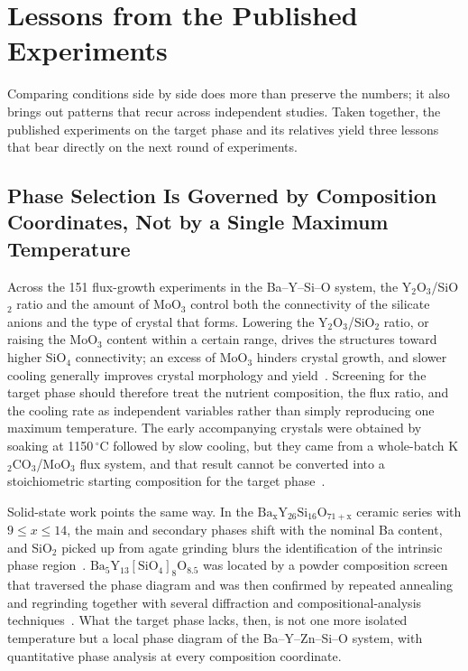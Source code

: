 \section{Lessons from the Published Experiments}
\label{sec:prior-findings}

Comparing conditions side by side does more than preserve the numbers; it also brings out patterns that recur across independent studies. Taken together, the published experiments on the target phase and its relatives yield three lessons that bear directly on the next round of experiments.

\subsection{Phase Selection Is Governed by Composition Coordinates, Not by a Single Maximum Temperature}

Across the 151 flux-growth experiments in the Ba--Y--Si--O system, the Y$_2$O$_3$\slash SiO$_2$ ratio and the amount of MoO$_3$ control both the connectivity of the silicate anions and the type of crystal that forms. Lowering the Y$_2$O$_3$\slash SiO$_2$ ratio, or raising the MoO$_3$ content within a certain range, drives the structures toward higher SiO$_4$ connectivity; an excess of MoO$_3$ hinders crystal growth, and slower cooling generally improves crystal morphology and yield~\cite{wierzbickawieczorek2017high}. Screening for the target phase should therefore treat the nutrient composition, the flux ratio, and the cooling rate as independent variables rather than simply reproducing one maximum temperature. The early accompanying crystals were obtained by soaking at 1150\,$^\circ$C followed by slow cooling, but they came from a whole-batch K$_2$CO$_3$\slash MoO$_3$ flux system, and that result cannot be converted into a stoichiometric starting composition for the target phase~\cite{kolitsch2009crystal}.

Solid-state work points the same way. In the $\mathrm{Ba_xY_{26}Si_{16}O_{71+x}}$ ceramic series with $9\le x\le 14$, the main and secondary phases shift with the nominal Ba content, and SiO$_2$ picked up from agate grinding blurs the identification of the intrinsic phase region~\cite{yamane2024microstructure}. $\mathrm{Ba_5Y_{13}[SiO_4]_8O_{8.5}}$ was located by a powder composition screen that traversed the phase diagram and was then confirmed by repeated annealing and regrinding together with several diffraction and compositional-analysis techniques~\cite{gulay2024navigation}. What the target phase lacks, then, is not one more isolated temperature but a local phase diagram of the Ba--Y--Zn--Si--O system, with quantitative phase analysis at every composition coordinate.

